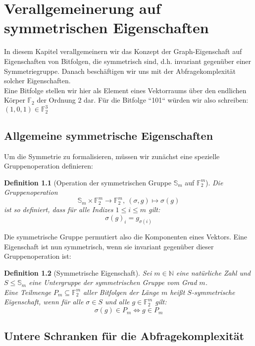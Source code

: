 \documentclass[a4paper]{scrreprt}
\newtheorem{definition}{Definition}
\theoremstyle{definition}
\begin{document}
\chapter{Verallgemeinerung auf symmetrischen Eigenschaften}
In diesem Kapitel verallgemeinern wir das Konzept der
Graph-Eigenschaft auf Eigenschaften von Bitfolgen, die
symmetrisch sind, d.h. invariant gegenüber einer Symmetriegruppe.
Danach beschäftigen wir uns mit der Abfragekomplexität
solcher Eigenschaften. \\
Eine Bitfolge stellen wir hier als Element eines Vektorraums
über den endlichen Körper $\mathbb{F}_2$ der Ordnung $2$ dar.
Für die Bitfolge ``101`` würden wir also schreiben:
$ (1,0,1) \in \mathbb{F}_2^3$

\section{Allgemeine symmetrische Eigenschaften}
Um die Symmetrie zu formalisieren, müssen wir zunächst
eine spezielle Gruppenoperation definieren:

\begin{definition}
[Operation der symmetrischen Gruppe $\mathbb{S}_m$ auf $\mathbb{F}_2^m$]
Die Gruppenoperation
$$\mathbb{S}_m \times \mathbb{F}_2^m \to \mathbb{F}_2^m, \ (\sigma,g) \mapsto \sigma(g)$$
ist so definiert, dass für alle Indizes $1\leq i \leq m$ gilt:
$$ \sigma(g)_i = g_{\sigma(i)} $$
\end{definition}
Die symmetrische Gruppe permutiert also die Komponenten eines
Vektors. Eine Eigenschaft ist nun symmetrisch, wenn sie invariant
gegenüber dieser Gruppenoperation ist:

\begin{definition}[Symmetrische Eigenschaft]
Sei $m\in \mathbb{N}$ eine natürliche Zahl und
$S \leq \mathbb{S}_m$ eine Untergruppe der 
symmetrischen Gruppe vom Grad $m$. \\
Eine Teilmenge
$P_m \subseteq \mathbb{F}_2^m$ aller Bitfolgen der
Länge $m$ heißt \emph{$S$-symmetrische Eigenschaft}, wenn
für alle $\sigma \in S$ und alle $g\in \mathbb{F}_2^m$ gilt:
$$ \sigma(g)\in P_m \iff g \in P_m $$ 
\end{definition}

\section{Untere Schranken für die Abfragekomplexität}
\end{document}
